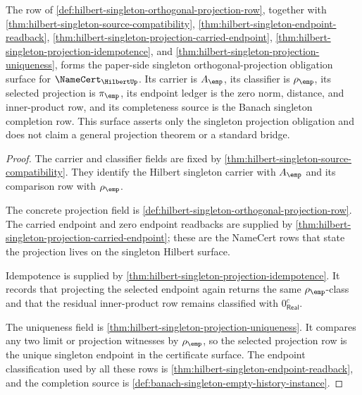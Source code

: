 \begin{theorem}
\label{thm:hilbert-singleton-orthogonal-projection-namecert-surface}
The row of
\autoref{def:hilbert-singleton-orthogonal-projection-row}, together with
\autoref{thm:hilbert-singleton-source-compatibility},
\autoref{thm:hilbert-singleton-endpoint-readback},
\autoref{thm:hilbert-singleton-projection-carried-endpoint},
\autoref{thm:hilbert-singleton-projection-idempotence}, and
\autoref{thm:hilbert-singleton-projection-uniqueness}, forms the paper-side
singleton orthogonal-projection obligation surface for
$\NameCert_{\HilbertUp}$. Its carrier is $A_{\emp}$, its classifier is
$\rho_{\emp}$, its selected projection is $\pi_{\emp}$, its endpoint ledger is
the zero norm, distance, and inner-product row, and its completeness source is
the Banach singleton completion row. This surface asserts only the singleton
projection obligation and does not claim a general projection theorem or a
standard bridge.
\end{theorem}
\begin{proof}
The carrier and classifier fields are fixed by
\autoref{thm:hilbert-singleton-source-compatibility}. They identify the
Hilbert singleton carrier with $A_{\emp}$ and its comparison row with
$\rho_{\emp}$.

The concrete projection field is
\autoref{def:hilbert-singleton-orthogonal-projection-row}. The carried endpoint
and zero endpoint readbacks are supplied by
\autoref{thm:hilbert-singleton-projection-carried-endpoint}; these are the
NameCert rows that state the projection lives on the singleton Hilbert
surface.

Idempotence is supplied by
\autoref{thm:hilbert-singleton-projection-idempotence}. It records that
projecting the selected endpoint again returns the same $\rho_{\emp}$-class
and that the residual inner-product row remains classified with
$0_{\mathsf{Real}}^{c}$.

The uniqueness field is
\autoref{thm:hilbert-singleton-projection-uniqueness}. It compares any two
limit or projection witnesses by $\rho_{\emp}$, so the selected projection row
is the unique singleton endpoint in the certificate surface. The endpoint
classification used by all these rows is
\autoref{thm:hilbert-singleton-endpoint-readback}, and the completion source is
\autoref{def:banach-singleton-empty-history-instance}.
\end{proof}

